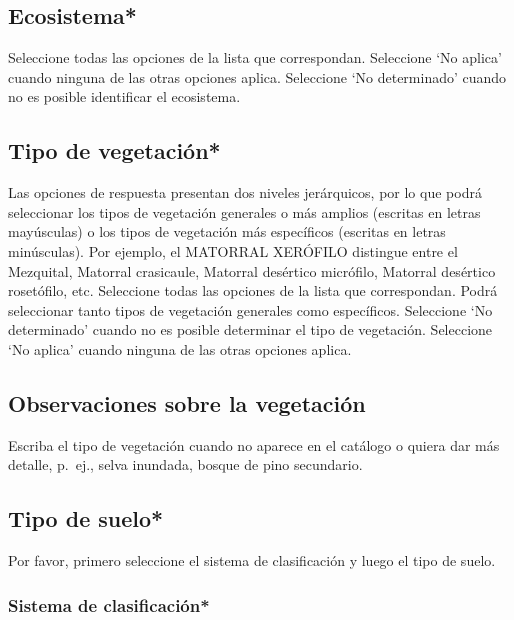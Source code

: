 \documentclass[
]{book}
\begin{document}
\hypertarget{ecosistema}{%
\subsection{Ecosistema*}\label{ecosistema}}

Seleccione todas las opciones de la lista que correspondan.
Seleccione `No aplica' cuando ninguna de las otras opciones aplica.
Seleccione `No determinado' cuando no es posible identificar el ecosistema.

\hypertarget{tipo-de-vegetaciuxf3n}{%
\subsection{Tipo de vegetación*}\label{tipo-de-vegetaciuxf3n}}

Las opciones de respuesta presentan dos niveles jerárquicos, por lo que podrá seleccionar los tipos de vegetación generales o más amplios (escritas en letras mayúsculas) o los tipos de vegetación más específicos (escritas en letras minúsculas). Por ejemplo, el MATORRAL XERÓFILO distingue entre el Mezquital, Matorral crasicaule, Matorral desértico micrófilo, Matorral desértico rosetófilo, etc.
Seleccione todas las opciones de la lista que correspondan. Podrá seleccionar tanto tipos de vegetación generales como específicos.
Seleccione `No determinado' cuando no es posible determinar el tipo de vegetación.
Seleccione `No aplica' cuando ninguna de las otras opciones aplica.

\hypertarget{observaciones-sobre-la-vegetaciuxf3n}{%
\subsection{Observaciones sobre la vegetación}\label{observaciones-sobre-la-vegetaciuxf3n}}

Escriba el tipo de vegetación cuando no aparece en el catálogo o quiera dar más detalle, p.~ej., selva inundada, bosque de pino secundario.

\hypertarget{tipo-de-suelo}{%
\subsection{Tipo de suelo*}\label{tipo-de-suelo}}

Por favor, primero seleccione el sistema de clasificación y luego el tipo de suelo.

\hypertarget{sistema-de-clasificaciuxf3n}{%
\subsubsection{Sistema de clasificación*}\label{sistema-de-clasificaciuxf3n}}
\end{document}

